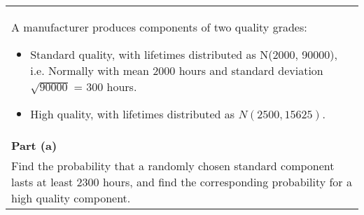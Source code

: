 \documentclass[a4paper,12pt]{article}
\begin{document}
\begin{table}[ht!]
 \centering
 \begin{tabular}{|p{15cm}|}
 \hline
\noindent A manufacturer produces components of two quality grades:
\begin{itemize}
    \item Standard quality, with lifetimes distributed as N(2000, 90000), i.e.
 Normally with mean 2000 hours and standard deviation $\sqrt{90000}$ = 300
hours.
\item High quality, with lifetimes distributed as $N(2500, 15625)$.
\end{itemize}
\\
\noindent \textbf{Part (a)}\\
Find the probability that a randomly chosen standard component
lasts at least 2300 hours, and find the corresponding probability for
a high quality component.
\\ \hline
  \end{tabular}
\end{table}
\end{document}
